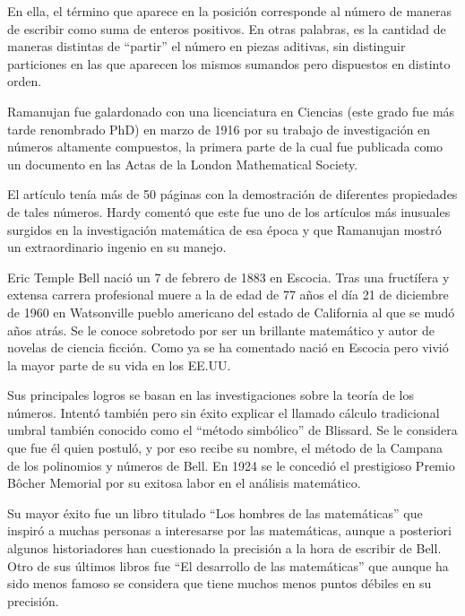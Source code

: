 \documentclass[11pt,letterpaper]{report}
\begin{document}
\begin{enumerate}
\begin{itemize}
    En ella, el término que aparece en la posición corresponde al número de maneras de escribir como
    suma de enteros positivos. En otras palabras, es la cantidad de maneras distintas de ``partir''
    el número en piezas aditivas, sin distinguir particiones en las que aparecen los mismos sumandos
    pero dispuestos en distinto orden.

    Ramanujan fue galardonado con una licenciatura en Ciencias (este grado fue más tarde renombrado
    PhD) en marzo de 1916 por su trabajo de investigación en números altamente compuestos, la
    primera parte de la cual fue publicada como un documento en las Actas de la London Mathematical
    Society.

    El artículo tenía más de 50 páginas con la demostración de diferentes propiedades de tales
    números. Hardy comentó que este fue uno de los artículos más inusuales surgidos en la
    investigación matemática de esa época y que Ramanujan mostró un extraordinario ingenio en su
    manejo.


    Eric Temple Bell nació un 7 de febrero de 1883 en  Escocia. Tras una fructífera y extensa
    carrera profesional muere a la de edad de 77 años el día 21 de diciembre de 1960 en Watsonville
    pueblo americano del estado de California al que se mudó años atrás. Se le conoce sobretodo por
    ser un brillante matemático y autor de novelas de ciencia ficción. Como ya se ha comentado nació
    en Escocia pero vivió la mayor parte de su vida en los EE.UU. 

    Sus principales logros se basan en las investigaciones sobre la teoría de los números. Intentó
    también pero sin éxito explicar el llamado cálculo tradicional umbral también conocido como el
    ``método simbólico'' de Blissard. Se le considera que fue él quien postuló, y por eso recibe su
    nombre, el método de la Campana de los polinomios y números de Bell. En 1924 se le concedió el
    prestigioso Premio Bôcher Memorial por su exitosa labor en el análisis matemático.

    Su mayor éxito fue un libro titulado ``Los hombres de las matemáticas'' que inspiró a muchas
    personas a interesarse por las matemáticas, aunque a posteriori algunos historiadores han
    cuestionado la precisión a la hora de escribir de Bell. Otro de sus últimos libros fue
    ``El desarrollo de las matemáticas'' que aunque ha sido menos famoso se considera que tiene
    muchos menos puntos débiles en su precisión.

\end{itemize}


\end{enumerate}





\end{document}
